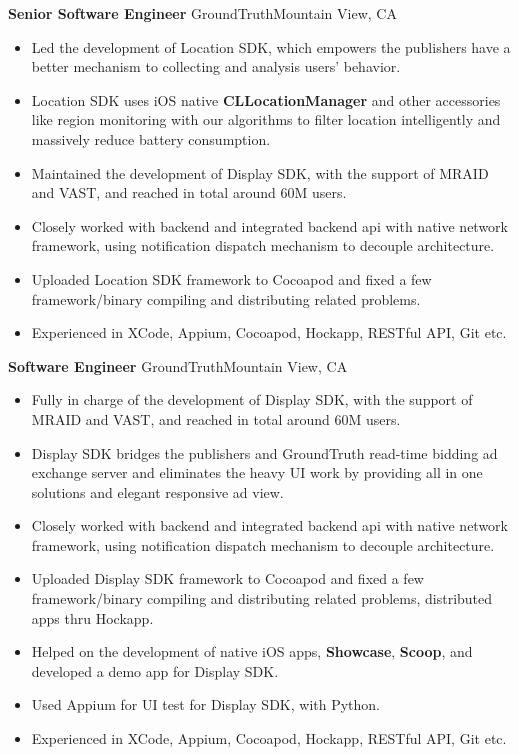 \documentclass[10pt,letterpaper,sans]{moderncv}        %
\begin{document}
\vspace*{0.5cm}
{\textbf{Senior Software Engineer}}
{GroundTruth}{Mountain View, CA}{}{
\begin{itemize}
\item Led the development of Location SDK, which empowers the publishers have a better mechanism to collecting and analysis users' behavior.
\item Location SDK uses iOS native \textbf{CLLocationManager} and other accessories like region monitoring with our algorithms to filter location intelligently and massively reduce battery consumption.
\item Maintained the development of Display SDK, with the support of MRAID and VAST, and reached in total around 60M users.
\item Closely worked with backend and integrated backend api with native network framework, using notification dispatch mechanism to decouple architecture.
\item Uploaded Location SDK framework to Cocoapod and fixed a few framework/binary compiling and distributing related problems.
\item Experienced in XCode, Appium, Cocoapod, Hockapp, RESTful API, Git etc.
\end{itemize}} 

\vspace*{0.5cm}
{\textbf{Software Engineer}}
{GroundTruth}{Mountain View, CA}{}{
\begin{itemize}
\item Fully in charge of the development of Display SDK, with the support of MRAID and VAST, and reached in total around 60M users.
\item Display SDK bridges the publishers and GroundTruth read-time bidding ad exchange server and eliminates the heavy UI work by providing all in one solutions and elegant responsive ad view.
\item Closely worked with backend and integrated backend api with native network framework, using notification dispatch mechanism to decouple architecture.
\item Uploaded Display SDK framework to Cocoapod and fixed a few framework/binary compiling and distributing related problems, distributed apps thru Hockapp.
\item Helped on the development of native iOS apps,  \textbf{Showcase}, \textbf{Scoop}, and developed a demo app for Display SDK.
\item Used Appium for UI test for Display SDK, with Python.
\item Experienced in XCode, Appium, Cocoapod, Hockapp, RESTful API, Git etc.
\end{itemize}} 
\end{document}

